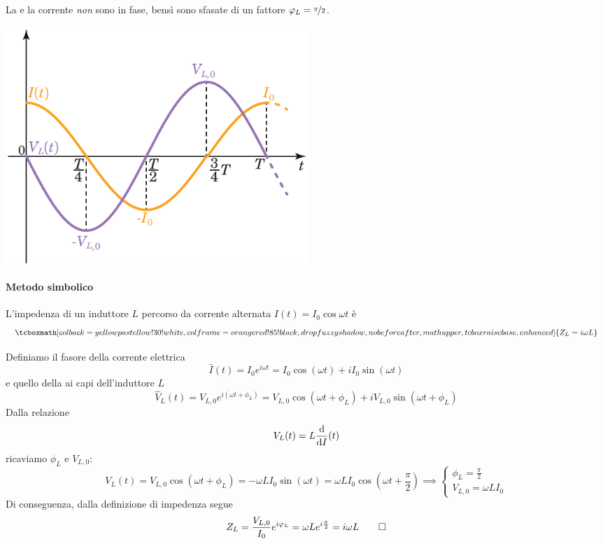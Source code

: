 La \ddp e la corrente \textit{non} sono in fase, bensì sono sfasate di un fattore $\oldphi_L=\nicefrac{\pi}{2}$.
\begin{center}
	\includegraphics[width=0.5\textwidth]{images/chp11/chp11Lsymbgraf2.pdf}
\end{center}
\paragraph{Metodo simbolico}
\begin{proposition}
	L'impedenza di un induttore $L$ percorso da corrente alternata $I(t)=I_0\cos\omega t$ è
	\begin{equation}
		\tcboxmath[colback=yellowpastellow!30!white,colframe=orangered!85!black,drop fuzzy shadow, nobeforeafter, math upper, tcbox raise base, enhanced]{Z_L=i\omega L}
	\end{equation}
\end{proposition}
\begin{demonstrationopt}
	Definiamo il fasore della corrente elettrica
	\begin{equation*}
		\hat{I}(t)=I_0e^{i\omega t}=I_0\cos(\omega t)+iI_0\sin(\omega t)
	\end{equation*}
	e quello della \ddp ai capi dell'induttore $L$
	\begin{equation*}
		\hat{V}_L(t)=V_{L,0}e^{i(\omega t+\phi_L)}=V_{L,0}\cos(\omega t+\phi_L)+iV_{L,0}\sin(\omega t+\phi_L)
	\end{equation*}
	Dalla relazione
	\begin{equation*}
		V_L(t)=L\dv{I}(t)
	\end{equation*}
	ricaviamo $\phi_L$ e $V_{L,0}$:
	\begin{equation*}
		V_L(t)=V_{L,0}\cos(\omega t+\phi_L)=-\omega L I_0\sin(\omega t)=\omega L I_0\cos(\omega t+\frac{\pi}{2})\implies \begin{cases}
			\phi_L=\frac{\pi}{2}\\
			V_{L,0}=\omega L I_0
		\end{cases} 
	\end{equation*}
	Di conseguenza, dalla definizione di impedenza segue
	\begin{equation*}
		Z_L=\frac{V_{L,0}}{I_0}e^{i\oldphi_L}=\omega Le^{i\frac{\pi}{2}}=i\omega L\qedhere
	\end{equation*}
\end{demonstrationopt}
